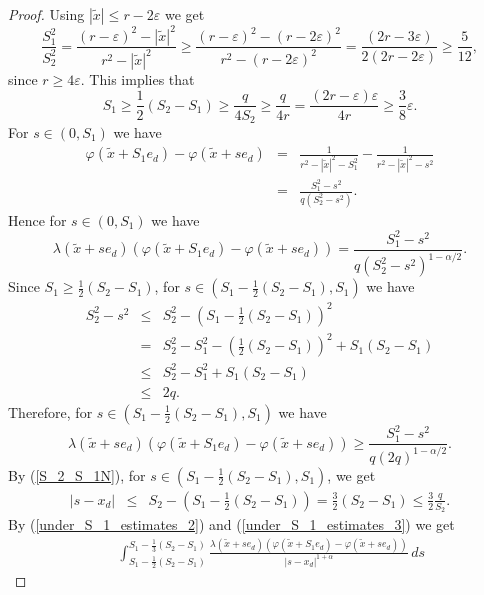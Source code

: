 \documentclass[a4paper,12pt,reqno]{amsart}
\theoremstyle{definition}
\theoremstyle{remark}
\newcommand{\eps}{\varepsilon}
\begin{document}
\begin{proof}
Using $ |\tilde{x}| \le r- 2 \eps$ we get 
$$\frac{S^2_1}{S^2_2}=\frac{(r-\eps)^2- |\tilde{x}|^2}{r^2- |\tilde{x}|^2}
\ge \frac{(r-\eps)^2- (r-2\eps)^2}{r^2- (r-2\eps)^2}= \frac{(2r-3\eps)}{2 (2r-2\eps)}\ge \frac{5}{12},$$
since $r\ge 4\eps$.
 This implies that 
$$S_1 \ge \frac 12(S_2-S_1)\ge \frac q{4S_2}\ge \frac q{4r}= \frac{(2r-\eps)\eps}{4r}\ge \frac38\eps .$$
For $s \in (0,S_1)$ we have
\begin{eqnarray*}
\varphi(\tilde{x} + S_1 e_d) - \varphi(\tilde{x} + s e_d)
&=& \frac{1}{r^2 - |\tilde{x}|^2 - S_1^2} - \frac{1}{r^2 - |\tilde{x}|^2 - s^2}\\
&=& \frac{S^2_1 - s^2}{q (S^2_2 - s^2)}.
\end{eqnarray*}
Hence for $s \in (0,S_1)$ we have
\begin{equation}
\label{under_S_1_estimates_1}
\lambda(\tilde{x} + s e_d) (\varphi(\tilde{x} + S_1 e_d) - \varphi(\tilde{x} + s e_d)) = 
\frac{ S^2_1 - s^2}{q  (S_2^2- s^2)^{1 - \alpha/2}}.
\end{equation}
Since $S_1 \ge \frac 12(S_2-S_1)$, for $s \in \left(S_1 - \frac 12(S_2-S_1), S_1\right)$ we have
\begin{eqnarray*}
S_2^2 - s^2 
&\le& S_2^2 - \left(S_1 -\frac 12(S_2-S_1)\right)^2\\
&=&  S_2^2 - S_1^2 - \left(\frac 12(S_2-S_1)\right)^2 +  S_1(S_2-S_1) \\
&\le&  S_2^2 - S_1^2  +  S_1(S_2-S_1) \\
&\le& 2q .
\end{eqnarray*}
Therefore, for $s \in \left(S_1 - \frac 12(S_2-S_1), S_1\right)$ we have
\begin{equation}
\label{under_S_1_estimates_2}
\lambda(\tilde{x} + s e_d) (\varphi(\tilde{x} + S_1 e_d) - \varphi(\tilde{x} + s e_d)) \ge 
\frac{S^2_1 - s^2}{q (2q)^{1 - \alpha/2}}.
\end{equation}
By (\ref{S_2_S_1N}), for $s \in \left(S_1- \frac 12(S_2-S_1), S_1\right)$, we get 
\begin{eqnarray}
|s - x_d| &\le & S_2-\left(S_1- \frac 12(S_2-S_1)\right)
 = \frac 32(S_2-S_1)
\le \frac 32 \frac q{S_2}. \label{under_S_1_estimates_3}
\end{eqnarray}
By (\ref{under_S_1_estimates_2}) and (\ref{under_S_1_estimates_3}) we get
\begin{eqnarray}
&&
\int_{S_1 -\frac 12(S_2-S_1)}^{S_1 -\frac 13(S_2-S_1)}
\frac{\lambda(\tilde{x} + s e_d) (\varphi(\tilde{x} + S_1 e_d) - \varphi(\tilde{x} + s e_d))}{|s - x_d|^{1 + \alpha}} \, ds

\end{eqnarray}
\end{proof}
\end{document}
